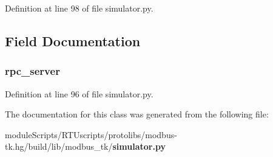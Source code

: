 Definition at line 98 of file simulator.\+py.



\subsection{Field Documentation}
\subsubsection[{rpc\+\_\+server}]{\setlength{\rightskip}{0pt plus 5cm}rpc\+\_\+server}\label{classmodbus__tk_1_1simulator_1_1_rpc_interface_abc206e2eea8564043b64058b06e5b079}


Definition at line 96 of file simulator.\+py.



The documentation for this class was generated from the following file\+:\begin{DoxyCompactItemize}
\item 
module\+Scripts/\+R\+T\+Uscripts/protolibs/modbus-\/tk.\+hg/build/lib/modbus\+\_\+tk/{\bf simulator.\+py}\end{DoxyCompactItemize}
